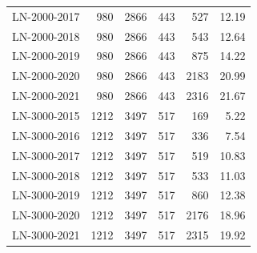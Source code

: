\begin{table}[h!]
\begin{tabular}{lrrrrr}
		LN-2000-2017                                                                 & 980  & 2866 & 443 & 527  & 12.19 \\
		LN-2000-2018                                                                 & 980  & 2866 & 443 & 543  & 12.64 \\
		LN-2000-2019                                                                 & 980  & 2866 & 443 & 875  & 14.22 \\
		LN-2000-2020                                                                 & 980  & 2866 & 443 & 2183 & 20.99 \\
		LN-2000-2021                                                                 & 980  & 2866 & 443 & 2316 & 21.67 \\ \hline
		LN-3000-2015                                                                 & 1212 & 3497 & 517 & 169  & 5.22  \\
		LN-3000-2016                                                                 & 1212 & 3497 & 517 & 336  & 7.54  \\
		LN-3000-2017                                                                 & 1212 & 3497 & 517 & 519  & 10.83 \\
		LN-3000-2018                                                                 & 1212 & 3497 & 517 & 533  & 11.03 \\
		LN-3000-2019                                                                 & 1212 & 3497 & 517 & 860  & 12.38 \\
		LN-3000-2020                                                                 & 1212 & 3497 & 517 & 2176 & 18.96 \\
		LN-3000-2021                                                                 & 1212 & 3497 & 517 & 2315 & 19.92 \\ \hline
	\end{tabular}%
\end{table}



